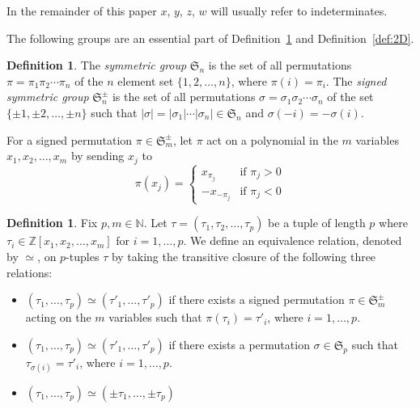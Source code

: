 \documentclass[12pt,table]{article}
\theoremstyle{definition}
\newtheorem{definition}[theorem]{Definition}
\theoremstyle{remark}
\newcommand{\Nnn}{\mathbb N}
\newcommand{\Zzz}{\mathbb Z}
\numberwithin{equation}{section}
\begin{document}
In the remainder of this paper $x$, $y$, $z$, $w$ will
usually refer to indeterminates.



The following groups are an essential part of Definition~\ref{def:general}
and Definition~\ref{def:2D}.
\begin{definition}
The {\em symmetric group} $ \mathfrak{S}_n $ is the 
set of all permutations $ \pi = \pi_1 \pi_2 \dotsm \pi_n $ 
of the $ n $ element set $ \{ 1, 2, \dotsc, n \} $,
where $ \pi(i) = \pi_i $.
The {\em signed symmetric group} $ \mathfrak{S}_n^\pm $
is the set of all permutations $ \sigma = \sigma_1 \sigma_2 \dotsm \sigma_n$
of the set $ \{ \pm 1, \pm 2, \dotsc, \pm n \} $ such that
$ | \sigma | = | \sigma_1 | \dotsm |\sigma_n| \in \mathfrak{S}_n $
and $ \sigma(-i) =  -\sigma(i) $.   
\end{definition}



For a signed permutation $ \pi \in \mathfrak{S}_m^\pm $,
let $ \pi $ act on a polynomial in the 
$m$ variables $ x_1,x_2, \dotsc, x_m $ by sending $ x_j $ to 
\[
\pi(x_j) =
\begin{cases}
x_{\pi_j} & \text{if } \pi_j > 0 \\
-x_{-\pi_j} & \text{if } \pi_j < 0
\end{cases}
\]

\begin{definition}
\label{def:general}
Fix $ p, m \in \Nnn $. 
Let $ \tau = ( \tau_1, \tau_2, \dotsc, \tau_p) $
be a tuple of length $ p $ where 
$ \tau_i \in \Zzz[x_1,x_2, \dotsc, x_m] $ for $ i = 1, \dotsc, p $.
We define an equivalence relation, denoted by $ \simeq $, on $p$-tuples
$ \tau $ 
by taking the transitive closure of the following three relations:
\begin{itemize}
\item
$ ( \tau_1, \dotsc, \tau_p) \simeq ( \tau'_1, \dotsc, \tau'_p) $
if there exists a signed permutation $ \pi \in \mathfrak{S}_m^\pm $
acting on the $ m $ variables such that $ \pi( \tau_i ) = \tau'_i $,
 where $ i = 1, \dotsc, p $.
\item
$ ( \tau_1, \dotsc, \tau_p) \simeq ( \tau'_1, \dotsc, \tau'_p) $
if there exists a permutation $ \sigma \in \mathfrak{S}_p $
such that $ \tau_{\sigma(i)} = \tau'_i $, where $ i = 1, \dotsc, p $.
\item
$ ( \tau_1, \dotsc, \tau_p) \simeq ( \pm \tau_1, \dotsc, \pm \tau_p) $
\end{itemize}
\end{definition}
\end{document}
